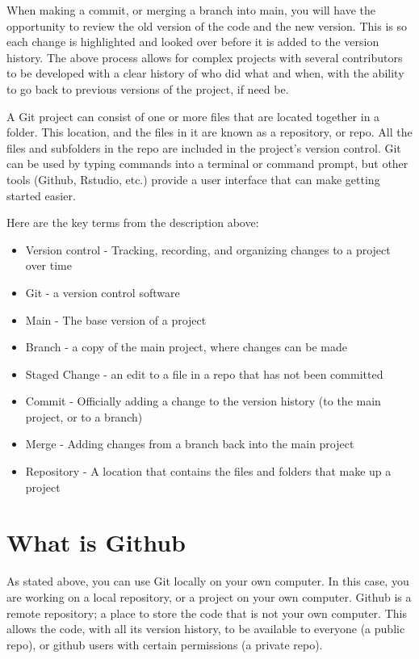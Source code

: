 \documentclass[
  letterpaper,
  DIV=11,
  numbers=noendperiod]{scrreprt}
\begin{document}
When making a commit, or merging a branch into main, you will have the
opportunity to review the old version of the code and the new version.
This is so each change is highlighted and looked over before it is added
to the version history. The above process allows for complex projects
with several contributors to be developed with a clear history of who
did what and when, with the ability to go back to previous versions of
the project, if need be.

A Git project can consist of one or more files that are located together
in a folder. This location, and the files in it are known as a
repository, or repo. All the files and subfolders in the repo are
included in the project's version control. Git can be used by typing
commands into a terminal or command prompt, but other tools (Github,
Rstudio, etc.) provide a user interface that can make getting started
easier.

Here are the key terms from the description above:

\begin{itemize}
\item
  Version control - Tracking, recording, and organizing changes to a
  project over time
\item
  Git - a version control software
\item
  Main - The base version of a project
\item
  Branch - a copy of the main project, where changes can be made
\item
  Staged Change - an edit to a file in a repo that has not been
  committed
\item
  Commit - Officially adding a change to the version history (to the
  main project, or to a branch)
\item
  Merge - Adding changes from a branch back into the main project
\item
  Repository - A location that contains the files and folders that make
  up a project
\end{itemize}

\hypertarget{what-is-github}{%
\section{What is Github}\label{what-is-github}}

As stated above, you can use Git locally on your own computer. In this
case, you are working on a local repository, or a project on your own
computer. Github is a remote repository; a place to store the code that
is not your own computer. This allows the code, with all its version
history, to be available to everyone (a public repo), or github users
with certain permissions (a private repo).
\end{document}
